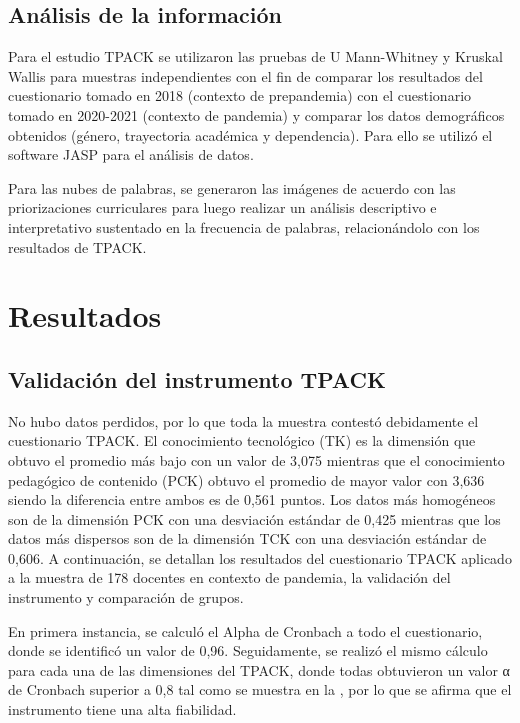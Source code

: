 \documentclass[spanish]{textolivre}
\begin{document}
\subsection{Análisis de la información}\label{sec-autores}
Para el estudio TPACK se utilizaron las pruebas de U Mann-Whitney y Kruskal Wallis para muestras independientes con el fin de comparar los resultados del cuestionario tomado en 2018 (contexto de prepandemia) con el cuestionario tomado en 2020-2021 (contexto de pandemia) y comparar los datos demográficos obtenidos (género, trayectoria académica y dependencia). Para ello se utilizó el software JASP para el análisis de datos.

Para las nubes de palabras, se generaron las imágenes de acuerdo con las priorizaciones curriculares para luego realizar un análisis descriptivo e interpretativo sustentado en la frecuencia de palabras, relacionándolo con los resultados de TPACK.

\section{Resultados}\label{sec-idioma}
\subsection{Validación del instrumento TPACK}
No hubo datos perdidos, por lo que toda la muestra contestó debidamente el cuestionario TPACK. El conocimiento tecnológico (TK) es la dimensión que obtuvo el promedio más bajo con un valor de 3,075 mientras que el conocimiento pedagógico de contenido (PCK) obtuvo el promedio de mayor valor con 3,636 siendo la diferencia entre ambos es de 0,561 puntos. Los datos más homogéneos son de la dimensión PCK con una desviación estándar de 0,425 mientras que los datos más dispersos son de la dimensión TCK con una desviación estándar de 0,606. A continuación, se detallan los resultados del cuestionario TPACK aplicado a la muestra de 178 docentes en contexto de pandemia, la validación del instrumento y comparación de grupos.

En primera instancia, se calculó el Alpha de Cronbach a todo el cuestionario, donde se identificó un valor de 0,96. Seguidamente, se realizó el mismo cálculo para cada una de las dimensiones del TPACK, donde todas obtuvieron un valor α de Cronbach superior a 0,8 tal como se muestra en la , por lo que se afirma que el instrumento tiene una alta fiabilidad. 
\end{document}
